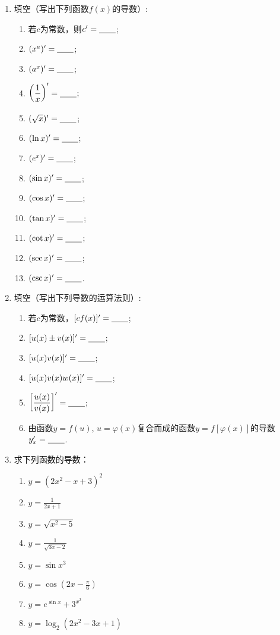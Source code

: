 \begin{ex}
\begin{enumerate}
    \item 填空（写出下列函数$f(x)$的导数）:
\begin{multicols}{2}
\begin{enumerate}[(1)]
    \item 若$c$为常数，则$c'=\underline{\qquad}$;
    \item $(x^{a})'=\underline{\qquad}$;
    \item $(a^x)'=\underline{\qquad}$;
    \item $\left(\dfrac{1}{x}\right)'=\underline{\qquad}$;
    \item $(\sqrt{x})'=\underline{\qquad}$;
    \item $(\ln x)'=\underline{\qquad}$;
    \item $(e^x)'=\underline{\qquad}$;
    \item $(\sin x)'=\underline{\qquad}$;
    \item $(\cos x)'=\underline{\qquad}$;
    \item $(\tan x)'=\underline{\qquad}$;
    \item $(\cot x)'=\underline{\qquad}$;
    \item $(\sec x)'=\underline{\qquad}$;
    \item $(\csc x)'=\underline{\qquad}$.
\end{enumerate}
\end{multicols}
    \item 填空（写出下列导数的运算法则）:
\begin{enumerate}[(1)]
    \item 若$c$为常数，$[cf(x)]'=\underline{\qquad}$;
    \item $[u(x)\pm v(x)]'=\underline{\qquad}$;
    \item $[u(x)v(x)]'=\underline{\qquad}$;
    \item $[u(x)v(x)w(x)]'=\underline{\qquad}$;
    \item $\left[\dfrac{u(x)}{v(x)}\right]'=\underline{\qquad}$;
    \item 由函数$y=f(u)$, $u=\varphi(x)$复合而成的函数$y=f[\varphi(x)]$的导数$y'_x=\underline{\qquad}$.
\end{enumerate}
    \item 求下列函数的导数：
\begin{multicols}{2}
\begin{enumerate}[(1)]
    \item $y=(2x^{2}-x+3)^{2}$
    \item $y=\frac{1}{2x+1}$
    \item $y=\sqrt{x^{2}-5}$
    \item $y=\frac{1}{\sqrt{3x-2}}$
    \item $y=\sin x^{3}$
    \item $y=\cos\left(2x-\frac{\pi}{6}\right)$
    \item $y=e^{\sin x}+3^{x^{2}}$
    \item $y=\log_{2}(2x^{2}-3x+1)$
\end{enumerate}
\end{multicols}
\end{enumerate}
\end{ex}


